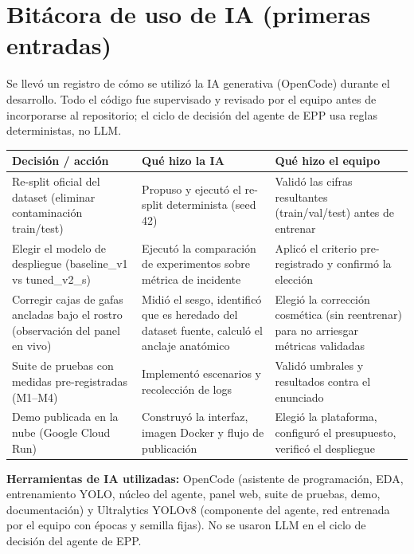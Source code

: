 \documentclass[10pt,letterpaper]{article}
\begin{document}
\section{Bitácora de uso de IA (primeras entradas)}

Se llevó un registro de cómo se utilizó la IA generativa (OpenCode) durante el desarrollo. Todo el código fue supervisado y revisado por el equipo antes de incorporarse al repositorio; el ciclo de decisión del agente de EPP usa reglas deterministas, no LLM.

\begin{tabularx}{\textwidth}{P{0.28\textwidth}Y P{0.16\textwidth}}
\toprule
\textbf{Decisión / acción} & \textbf{Qué hizo la IA} & \textbf{Qué hizo el equipo} \\
\midrule
Re-split oficial del dataset (eliminar contaminación train/test) & Propuso y ejecutó el re-split determinista (seed 42) & Validó las cifras resultantes (train/val/test) antes de entrenar \\
Elegir el modelo de despliegue (baseline\_v1 vs tuned\_v2\_s) & Ejecutó la comparación de experimentos sobre métrica de incidente & Aplicó el criterio pre-registrado y confirmó la elección \\
Corregir cajas de gafas ancladas bajo el rostro (observación del panel en vivo) & Midió el sesgo, identificó que es heredado del dataset fuente, calculó el anclaje anatómico & Elegió la corrección cosmética (sin reentrenar) para no arriesgar métricas validadas \\
Suite de pruebas con medidas pre-registradas (M1--M4) & Implementó escenarios y recolección de logs & Validó umbrales y resultados contra el enunciado \\
Demo publicada en la nube (Google Cloud Run) & Construyó la interfaz, imagen Docker y flujo de publicación & Elegió la plataforma, configuró el presupuesto, verificó el despliegue \\
\end{tabularx}

\vspace{2pt}
\textbf{Herramientas de IA utilizadas:} OpenCode (asistente de programación, EDA, entrenamiento YOLO, núcleo del agente, panel web, suite de pruebas, demo, documentación) y Ultralytics YOLOv8 (componente del agente, red entrenada por el equipo con épocas y semilla fijas). No se usaron LLM en el ciclo de decisión del agente de EPP.
\end{document}
